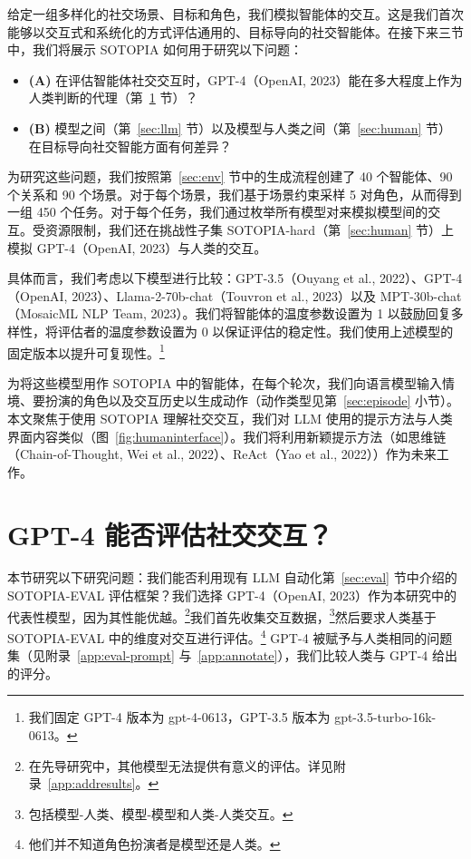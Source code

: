 \documentclass[11pt,a4paper]{article}
\begin{document}
给定一组多样化的社交场景、目标和角色，我们模拟智能体的交互。这是我们首次能够以交互式和系统化的方式评估通用的、目标导向的社交智能体。在接下来三节中，我们将展示 SOTOPIA 如何用于研究以下问题：
\begin{itemize}
    \item \textbf{(A)} 在评估智能体社交交互时，GPT-4（OpenAI, 2023）能在多大程度上作为人类判断的代理（第~\ref{sec:gpt4-eval} 节）？
    \item \textbf{(B)} 模型之间（第~\ref{sec:llm} 节）以及模型与人类之间（第~\ref{sec:human} 节）在目标导向社交智能方面有何差异？
\end{itemize}

为研究这些问题，我们按照第~\ref{sec:env} 节中的生成流程创建了 40 个智能体、90 个关系和 90 个场景。对于每个场景，我们基于场景约束采样 5 对角色，从而得到一组 450 个任务。对于每个任务，我们通过枚举所有模型对来模拟模型间的交互。受资源限制，我们还在挑战性子集 SOTOPIA-hard（第~\ref{sec:human} 节）上模拟 GPT-4（OpenAI, 2023）与人类的交互。

具体而言，我们考虑以下模型进行比较：GPT-3.5（Ouyang et al., 2022）、GPT-4（OpenAI, 2023）、Llama-2-70b-chat（Touvron et al., 2023）以及 MPT-30b-chat（MosaicML NLP Team, 2023）。我们将智能体的温度参数设置为 1 以鼓励回复多样性，将评估者的温度参数设置为 0 以保证评估的稳定性。我们使用上述模型的固定版本以提升可复现性。\footnote{我们固定 GPT-4 版本为 gpt-4-0613，GPT-3.5 版本为 gpt-3.5-turbo-16k-0613。}

为将这些模型用作 SOTOPIA 中的智能体，在每个轮次，我们向语言模型输入情境、要扮演的角色以及交互历史以生成动作（动作类型见第~\ref{sec:episode} 小节）。本文聚焦于使用 SOTOPIA 理解社交交互，我们对 LLM 使用的提示方法与人类界面内容类似（图~\ref{fig:humaninterface}）。我们将利用新颖提示方法（如思维链（Chain-of-Thought, Wei et al., 2022）、ReAct（Yao et al., 2022））作为未来工作。

\section{GPT-4 能否评估社交交互？}
\label{sec:gpt4-eval}

本节研究以下研究问题：我们能否利用现有 LLM 自动化第~\ref{sec:eval} 节中介绍的 SOTOPIA-EVAL 评估框架？我们选择 GPT-4（OpenAI, 2023）作为本研究中的代表性模型，因为其性能优越。\footnote{在先导研究中，其他模型无法提供有意义的评估。详见附录~\ref{app:addresults}。}我们首先收集交互数据，\footnote{包括模型-人类、模型-模型和人类-人类交互。}然后要求人类基于 SOTOPIA-EVAL 中的维度对交互进行评估。\footnote{他们并不知道角色扮演者是模型还是人类。} GPT-4 被赋予与人类相同的问题集（见附录~\ref{app:eval-prompt} 与~\ref{app:annotate}），我们比较人类与 GPT-4 给出的评分。
\end{document}
